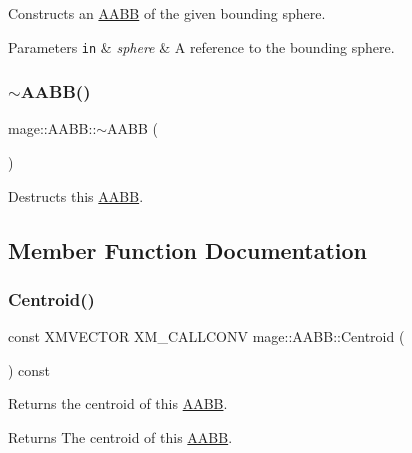 Constructs an \mbox{\hyperlink{classmage_1_1_a_a_b_b}{A\+A\+BB}} of the given bounding sphere.


\begin{DoxyParams}[1]{Parameters}
\mbox{\tt in}  & {\em sphere} & A reference to the bounding sphere. \\
\hline
\end{DoxyParams}
\mbox{\label{classmage_1_1_a_a_b_b_a0fa31372f7488cb30b886c77bd676f17}} 
\subsubsection{\texorpdfstring{$\sim$\+A\+A\+B\+B()}{~AABB()}}
{\footnotesize\ttfamily mage\+::\+A\+A\+B\+B\+::$\sim$\+A\+A\+BB (\begin{DoxyParamCaption}{ }\end{DoxyParamCaption})\hspace{0.3cm}{\ttfamily [default]}}

Destructs this \mbox{\hyperlink{classmage_1_1_a_a_b_b}{A\+A\+BB}}. 

\subsection{Member Function Documentation}
\mbox{\label{classmage_1_1_a_a_b_b_a7555db5bea72d1e7ba04931fcbb88aa0}} 
\subsubsection{\texorpdfstring{Centroid()}{Centroid()}}
{\footnotesize\ttfamily const X\+M\+V\+E\+C\+T\+OR X\+M\+\_\+\+C\+A\+L\+L\+C\+O\+NV mage\+::\+A\+A\+B\+B\+::\+Centroid (\begin{DoxyParamCaption}{ }\end{DoxyParamCaption}) const\hspace{0.3cm}{\ttfamily [noexcept]}}

Returns the centroid of this \mbox{\hyperlink{classmage_1_1_a_a_b_b}{A\+A\+BB}}.

\begin{DoxyReturn}{Returns}
The centroid of this \mbox{\hyperlink{classmage_1_1_a_a_b_b}{A\+A\+BB}}. 
\end{DoxyReturn}
\mbox{\label{classmage_1_1_a_a_b_b_ad3e011e47a16a9ecb84811296bbbcb1c}} 
